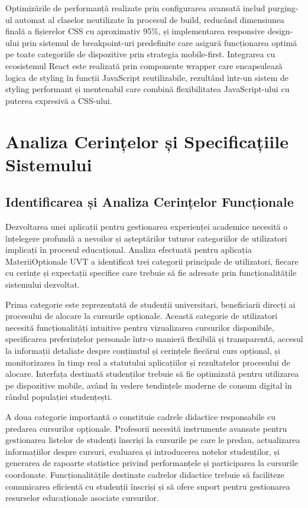 \documentclass[12pt,a4paper]{report}
\begin{document}
Optimizările de performanță realizate prin configurarea avansată includ purging-ul automat al claselor neutilizate în procesul de build, reducând dimensiunea finală a fișierelor CSS cu aproximativ 95\%, și implementarea responsive design-ului prin sistemul de breakpoint-uri predefinite care asigură funcționarea optimă pe toate categoriile de dispozitive prin strategia mobile-first. Integrarea cu ecosistemul React este realizată prin componente wrapper care encapsulează logica de styling în funcții JavaScript reutilizabile, rezultând într-un sistem de styling performant și mentenabil care combină flexibilitatea JavaScript-ului cu puterea expresivă a CSS-ului.


\chapter{Analiza Cerințelor și Specificațiile Sistemului}

\section{Identificarea și Analiza Cerințelor Funcționale}

Dezvoltarea unei aplicații pentru gestionarea experienței academice necesită o înțelegere profundă a nevoilor și așteptărilor tuturor categoriilor de utilizatori implicați în procesul educațional. Analiza efectuată pentru aplicația MateriiOptionale UVT a identificat trei categorii principale de utilizatori, fiecare cu cerințe și expectații specifice care trebuie să fie adresate prin funcționalitățile sistemului dezvoltat.

Prima categorie este reprezentată de studenții universitari, beneficiarii direcți ai procesului de alocare la cursurile opționale. Această categorie de utilizatori necesită funcționalități intuitive pentru vizualizarea cursurilor disponibile, specificarea preferințelor personale într-o manieră flexibilă și transparentă, accesul la informații detaliate despre conținutul și cerințele fiecărui curs opțional, și monitorizarea în timp real a statutului aplicațiilor și rezultatelor procesului de alocare. Interfața destinată studenților trebuie să fie optimizată pentru utilizarea pe dispozitive mobile, având în vedere tendințele moderne de consum digital în rândul populației studențești.

A doua categorie importantă o constituie cadrele didactice responsabile cu predarea cursurilor opționale. Profesorii necesită instrumente avansate pentru gestionarea listelor de studenți înscriși la cursurile pe care le predau, actualizarea informațiilor despre cursuri, evaluarea și introducerea notelor studenților, și generarea de rapoarte statistice privind performanțele și participarea la cursurile coordonate. Funcționalitățile destinate cadrelor didactice trebuie să faciliteze comunicarea eficientă cu studenții înscriși și să ofere suport pentru gestionarea resurselor educaționale asociate cursurilor.
\end{document}
